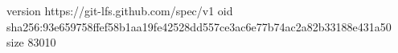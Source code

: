version https://git-lfs.github.com/spec/v1
oid sha256:93e659758ffef58b1aa19fe42528dd557ce3ac6e77b74ac2a82b33188e431a50
size 83010
